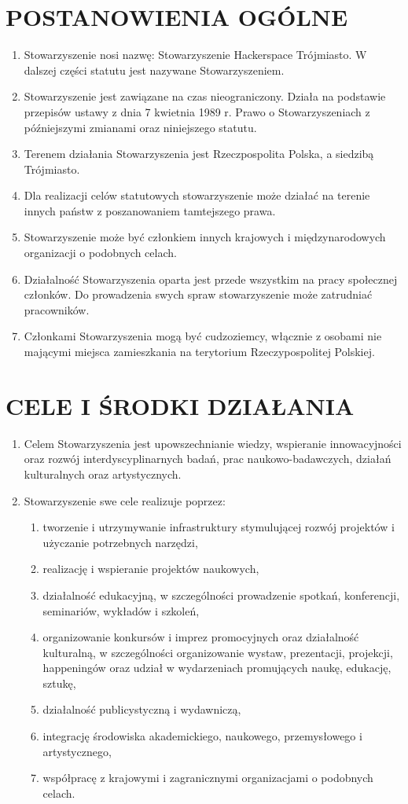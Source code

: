 \documentclass[a4paper,draft,10pt]{article}
\begin{document}
\section{POSTANOWIENIA OGÓLNE}
  \begin{enumerate}
    \item Stowarzyszenie nosi nazwę: Stowarzyszenie Hackerspace Trójmiasto. W dalszej części statutu jest nazywane Stowarzyszeniem.
    \item Stowarzyszenie jest zawiązane na czas nieograniczony. Działa na podstawie przepisów ustawy z dnia 7 kwietnia 1989 r. Prawo o Stowarzyszeniach z późniejszymi zmianami oraz niniejszego statutu.
    \item Terenem działania Stowarzyszenia jest Rzeczpospolita Polska, a siedzibą Trójmiasto.
    \item Dla realizacji celów statutowych stowarzyszenie może działać na terenie innych państw z poszanowaniem tamtejszego prawa.
    \item Stowarzyszenie może być członkiem innych krajowych i międzynarodowych organizacji o podobnych celach.
    \item Działalność Stowarzyszenia oparta jest przede wszystkim na pracy społecznej członków.
    Do prowadzenia swych spraw stowarzyszenie może zatrudniać pracowników.
    \item Członkami Stowarzyszenia mogą być cudzoziemcy, włącznie z osobami nie mającymi miejsca zamieszkania na terytorium Rzeczypospolitej Polskiej.
  \end{enumerate}
\section{CELE I ŚRODKI DZIAŁANIA}
  \begin{enumerate}
    \item Celem Stowarzyszenia jest upowszechnianie wiedzy, wspieranie innowacyjności oraz rozwój interdyscyplinarnych badań, prac naukowo-badawczych, działań kulturalnych oraz artystycznych.
    \item Stowarzyszenie swe cele realizuje poprzez:
      \begin{enumerate}
        \item tworzenie i utrzymywanie infrastruktury stymulującej rozwój projektów i użyczanie potrzebnych narzędzi,
        \item realizację i wspieranie projektów naukowych,
        \item działalność edukacyjną, w szczególności prowadzenie spotkań, konferencji, seminariów, wykładów i szkoleń,
        \item organizowanie konkursów i imprez promocyjnych oraz działalność kulturalną, w szczególności organizowanie wystaw, prezentacji, projekcji, happeningów oraz udział w wydarzeniach promujących naukę, edukację, sztukę,
        \item działalność publicystyczną i wydawniczą,
        \item integrację środowiska akademickiego, naukowego, przemysłowego i artystycznego,
        \item współpracę z krajowymi i zagranicznymi organizacjami o podobnych celach.
      \end{enumerate}
  \end{enumerate}
\end{document}
